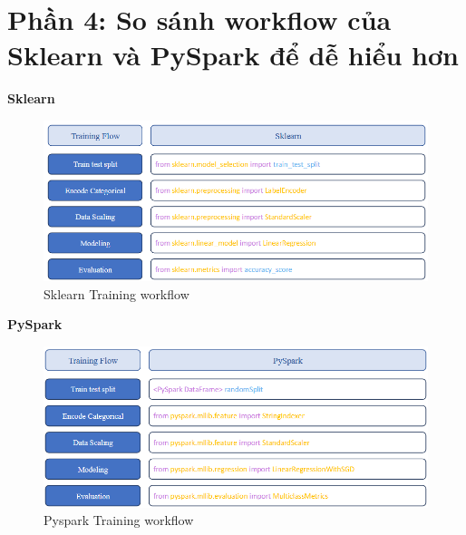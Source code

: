 \documentclass[11pt]{article}
\begin{document}
\section{Phần 4: So sánh workflow của Sklearn và PySpark để dễ hiểu hơn}
\textbf{Sklearn}
\begin{figure}[H]
    \centering
    \includegraphics[width=0.7\linewidth]{images/sklearnFlow.png}
    \caption{Sklearn Training workflow}
\end{figure}


\textbf{PySpark}
\begin{figure}[H]
    \centering
    \includegraphics[width=0.7\linewidth]{images/pysparkFlow.png}
    \caption{Pyspark Training workflow}
\end{figure}

\printbibliography
\end{document}
